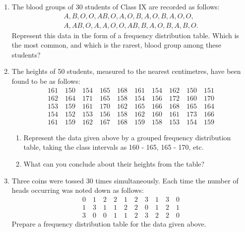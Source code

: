 \documentclass[a4paper,leqno,12pt]{amsart}
\begin{document}
\begin{enumerate}
\setlength\itemsep{1em}

\item The blood groups of 30 students of Class IX are recorded as follows:
\begin{align*}
A, B, O, O, AB, O, A, O, B, A, O, B, A, O, O, \\
A, AB, O, A, A, O, O, AB, B, A, O, B, A, B, O.
\end{align*}
Represent this data in the form of a frequency distribution table. Which is the most
common, and which is the rarest, blood group among these students?

\item The heights of 50 students, measured to the nearest centimetres, have been found to
be as follows:
\begin{align*}
161 \quad 150 \quad 154 \quad 165 \quad 168 \quad161 \quad 154 \quad 162 \quad 150 \quad 151 \\
162 \quad 164 \quad 171 \quad 165 \quad 158 \quad 154 \quad 156 \quad 172 \quad 160 \quad 170 \\
153 \quad 159 \quad 161 \quad 170 \quad 162 \quad 165 \quad 166 \quad 168 \quad 165 \quad 164 \\
154 \quad 152 \quad 153 \quad 156 \quad 158 \quad 162 \quad 160 \quad 161 \quad 173 \quad 166 \\
161 \quad 159 \quad 162 \quad 167 \quad 168 \quad 159 \quad 158 \quad 153 \quad 154 \quad 159
\end{align*}
\begin{enumerate}
 \item Represent the data given above by a grouped frequency distribution table, taking
the class intervals as 160 - 165, 165 - 170, etc.
 \item What can you conclude about their heights from the table?
\end{enumerate}

\item Three coins were tossed 30 times simultaneously. Each time the number of heads
occurring was noted down as follows: 
\begin{align*}
 0 \quad 1 \quad 2 \quad 2 \quad 1 \quad 2 \quad 3 \quad 1 \quad 3 \quad 0 \\
1 \quad 3 \quad 1 \quad 1 \quad 2 \quad 2 \quad 0 \quad 1 \quad 2 \quad 1 \\
3 \quad 0 \quad 0 \quad 1 \quad 1 \quad 2 \quad 3 \quad 2 \quad 2 \quad 0
\end{align*}
Prepare a frequency distribution table for the data given above.


\end{enumerate}
\end{document}
